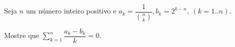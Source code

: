 Seja \(n\) um número inteiro positivo e \(a_k = \dfrac{1}{\binom{n}{k}}, b_k = 2^{k-n},\ (k=1..n)\).

Mostre que \(\sum_{k=1}^n \dfrac{a_k-b_k}{k} = 0\).
